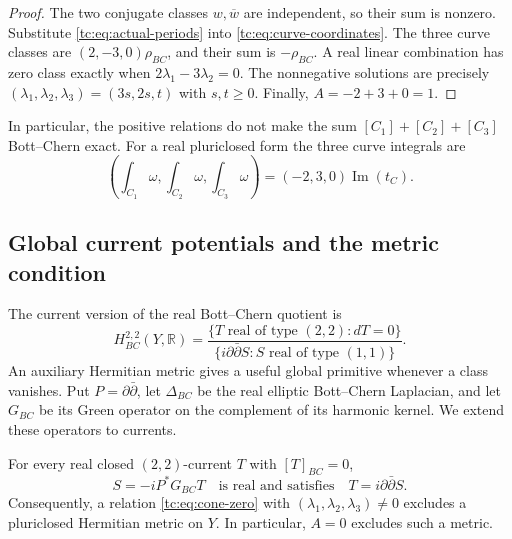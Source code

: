 \begin{proof}
The two conjugate classes $w,\overline w$ are independent,
so their sum is nonzero.
Substitute \eqref{tc:eq:actual-periods} into
\eqref{tc:eq:curve-coordinates}.
The three curve classes are $(2,-3,0)\rho_{BC}$, and their
sum is $-\rho_{BC}$.
A real linear combination has zero class exactly when
$2\lambda_1-3\lambda_2=0$.
The nonnegative solutions are precisely
$(\lambda_1,\lambda_2,\lambda_3)=(3s,2s,t)$ with $s,t\ge0$.
Finally, $A=-2+3+0=1$.
\end{proof}

In particular, the positive relations do not make the sum
$[C_1]+[C_2]+[C_3]$ Bott--Chern exact.
For a real pluriclosed form the three curve integrals are
\begin{equation}\label{tc:eq:evaluated-areas}
 \left(\int_{C_1}\omega,\int_{C_2}\omega,\int_{C_3}\omega\right)
                   =(-2,3,0)\operatorname{Im}(t_C).
\end{equation}

\subsection{Global current potentials and the metric condition}

The current version of the real Bott--Chern quotient is
\begin{equation}\label{tc:eq:real-current-BC}
 H_{BC}^{2,2}(Y,\mathbb R)
  =\frac{\{T\text{ real of type }(2,2):dT=0\}}
         {\{i\partial\bar\partial S:
                               S\text{ real of type }(1,1)\}}.
\end{equation}
An auxiliary Hermitian metric gives a useful global primitive
whenever a class vanishes.
Put $P=\partial\bar\partial$, let $\Delta_{BC}$ be the real
elliptic Bott--Chern Laplacian, and let $G_{BC}$ be its Green
operator on the complement of its harmonic kernel.
We extend these operators to currents.

\begin{proposition}\label{tc:prop:global-potential}
For every real closed $(2,2)$-current $T$ with $[T]_{BC}=0$,
\begin{equation}\label{tc:eq:global-potential}
          S=-iP^*G_{BC}T
          \quad\text{is real and satisfies}\quad
          T=i\partial\bar\partial S.
\end{equation}
Consequently, a relation \eqref{tc:eq:cone-zero} with
$(\lambda_1,\lambda_2,\lambda_3)\ne0$ excludes a pluriclosed
Hermitian metric on $Y$.
In particular, $A=0$ excludes such a metric.
\end{proposition}

